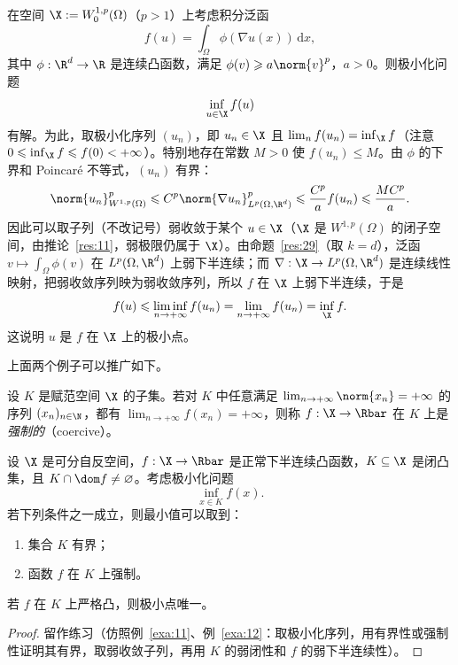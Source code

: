 \begin{example}[一个变分问题]
\label{exa:12}
在空间 $\X:=W_0^{1,p}(\Omega)$（$p>1$）上考虑积分泛函
\[
  f(u)=\int_\Omega\phi(\nabla u(x))\,\mathrm{d}x ,
\]
其中 $\phi:\R^d\to\R$ 是连续凸函数，满足 $\phi(v)\geqslant a\norm{v}^p$，$a>0$。则极小化问题
\[
  \inf_{u\in\X}f(u)
\]
有解。为此，取极小化序列 $(u_n)$，即 $u_n\in\X$ 且 $\lim_nf(u_n)=\inf_\X f$（注意 $0\leqslant\inf_\X f\leqslant f(0)<+\infty$）。特别地存在常数 $M>0$ 使 $f(u_n)\leqslant M$。由 $\phi$ 的下界和 Poincaré 不等式，$(u_n)$ 有界：
\[
  \norm{u_n}_{W^{1,p}(\Omega)}^p\leqslant C^p\norm{\nabla u_n}_{L^p(\Omega,\R^d)}^p\leqslant\frac{C^p}{a}f(u_n)\leqslant\frac{MC^p}{a} .
\]
因此可以取子列（不改记号）弱收敛于某个 $u\in\X$（$\X$ 是 $W^{1,p}(\Omega)$ 的闭子空间，由推论~\ref{res:11}，弱极限仍属于 $\X$）。由命题~\ref{res:29}（取 $k=d$），泛函 $v\mapsto\int_\Omega\phi(v)$ 在 $L^p(\Omega,\R^d)$ 上弱下半连续；而 $\nabla:\X\to L^p(\Omega,\R^d)$ 是连续线性映射，把弱收敛序列映为弱收敛序列，所以 $f$ 在 $\X$ 上弱下半连续，于是
\[
  f(u)\leqslant\liminf_{n\to+\infty}f(u_n)=\lim_{n\to+\infty}f(u_n)=\inf_\X f .
\]
这说明 $u$ 是 $f$ 在 $\X$ 上的极小点。
\end{example}

上面两个例子可以推广如下。

\begin{definition}[强制性]
\label{def:20}
设 $K$ 是赋范空间 $\X$ 的子集。若对 $K$ 中任意满足 $\lim_{n\to+\infty}\norm{x_n}=+\infty$ 的序列 $(x_n)_{n\in\N}$，都有 $\lim_{n\to+\infty}f(x_n)=+\infty$，则称 $f:\X\to\Rbar$ 在 $K$ 上是\emph{强制的}（coercive）。
\end{definition}

\begin{proposition}
\label{res:30}
设 $\X$ 是可分自反空间，$f:\X\to\Rbar$ 是正常下半连续凸函数，$K\subseteq\X$ 是闭凸集，且 $K\cap\dom f\neq\varnothing$。考虑极小化问题
\[
  \inf_{x\in K}f(x).
\]
若下列条件之一成立，则最小值可以取到：
\begin{enumerate}[label=\alph*.]
  \item 集合 $K$ 有界；
  \item 函数 $f$ 在 $K$ 上强制。
\end{enumerate}
若 $f$ 在 $K$ 上严格凸，则极小点唯一。
\end{proposition}

\begin{proof}
留作练习（仿照例~\ref{exa:11}、例~\ref{exa:12}：取极小化序列，用有界性或强制性证明其有界，取弱收敛子列，再用 $K$ 的弱闭性和 $f$ 的弱下半连续性）。
\end{proof}

